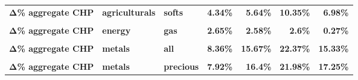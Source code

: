 \documentclass[
  authoryear,
  preprint,
  3p]{elsarticle}
\begin{document}
\begin{longtable}[t]{>{}l>{}l>{}l>{}r>{}r>{}r>{}r}
\addlinespace
\textbf{Δ\% aggregate CHP} & \textbf{agriculturals} & \textbf{softs} & \textcolor[HTML]{4285f4}{\textbf{4.34\%}} & \textcolor[HTML]{4285f4}{\textbf{5.64\%}} & \textcolor[HTML]{4285f4}{\textbf{10.35\%}} & \textcolor[HTML]{4285f4}{\textbf{6.98\%}}\\
\textbf{\cellcolor{gray!10}{Δ\% aggregate CHP}} & \textbf{\cellcolor{gray!10}{energy}} & \textbf{\cellcolor{gray!10}{all}} & \textcolor[HTML]{4285f4}{\textbf{\cellcolor{gray!10}{3.35\%}}} & \textcolor[HTML]{4285f4}{\textbf{\cellcolor{gray!10}{6.27\%}}} & \textcolor[HTML]{4285f4}{\textbf{\cellcolor{gray!10}{14.83\%}}} & \textcolor[HTML]{4285f4}{\textbf{\cellcolor{gray!10}{2.45\%}}}\\
\textbf{Δ\% aggregate CHP} & \textbf{energy} & \textbf{gas} & \textcolor[HTML]{4285f4}{\textbf{2.65\%}} & \textcolor[HTML]{4285f4}{\textbf{2.58\%}} & \textcolor[HTML]{4285f4}{\textbf{2.6\%}} & \textcolor[HTML]{4285f4}{\textbf{0.27\%}}\\
\textbf{\cellcolor{gray!10}{Δ\% aggregate CHP}} & \textbf{\cellcolor{gray!10}{energy}} & \textbf{\cellcolor{gray!10}{petroleum}} & \textcolor[HTML]{4285f4}{\textbf{\cellcolor{gray!10}{3.59\%}}} & \textcolor[HTML]{4285f4}{\textbf{\cellcolor{gray!10}{7.49\%}}} & \textcolor[HTML]{4285f4}{\textbf{\cellcolor{gray!10}{18.9\%}}} & \textcolor[HTML]{4285f4}{\textbf{\cellcolor{gray!10}{3.17\%}}}\\
\textbf{Δ\% aggregate CHP} & \textbf{metals} & \textbf{all} & \textcolor[HTML]{4285f4}{\textbf{8.36\%}} & \textcolor[HTML]{4285f4}{\textbf{15.67\%}} & \textcolor[HTML]{4285f4}{\textbf{22.37\%}} & \textcolor[HTML]{4285f4}{\textbf{15.33\%}}\\
\addlinespace
\textbf{\cellcolor{gray!10}{Δ\% aggregate CHP}} & \textbf{\cellcolor{gray!10}{metals}} & \textbf{\cellcolor{gray!10}{base}} & \textcolor[HTML]{4285f4}{\textbf{\cellcolor{gray!10}{10.12\%}}} & \textcolor[HTML]{4285f4}{\textbf{\cellcolor{gray!10}{12.74\%}}} & \textcolor[HTML]{4285f4}{\textbf{\cellcolor{gray!10}{23.94\%}}} & \textcolor[HTML]{4285f4}{\textbf{\cellcolor{gray!10}{7.67\%}}}\\
\textbf{Δ\% aggregate CHP} & \textbf{metals} & \textbf{precious} & \textcolor[HTML]{4285f4}{\textbf{7.92\%}} & \textcolor[HTML]{4285f4}{\textbf{16.4\%}} & \textcolor[HTML]{4285f4}{\textbf{21.98\%}} & \textcolor[HTML]{4285f4}{\textbf{17.25\%}}\\
\bottomrule

\end{longtable}

\endgroup{}
\end{document}
